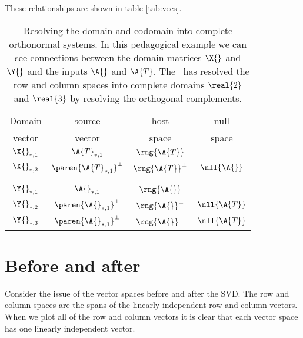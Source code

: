 These relationships are shown in table \eqref{tab:vecs}.

\begin{table}[h]
\begin{center}
\begin{tabular}{cccc}
Domain & source & host & null \\ vector & vector & space & space \\\hline\hline
$\X{}_{*,1}$ & $\A{T}_{*,1}$ & $\rng{\A{T}}$ \\[3pt]
$\X{}_{*,2}$ & $\paren{\A{T}_{*,1}}^{\perp}$ & $\rng{\A{T}}^{\perp}$ & $\nll{\A{}}$\\
&\\\hline
&\\
$\Y{}_{*,1}$ & $\A{}_{*,1}$ & $\rng{\A{}}$ \\[3pt]
$\Y{}_{*,2}$ & $\paren{\A{}_{*,1}}^{\perp}$ & $\rng{\A{}}^{\perp}$ & $\nll{\A{T}}$ \\[3pt]
$\Y{}_{*,3}$ & $\paren{\A{}_{*,1}}^{\perp}$ & $\rng{\A{}}^{\perp}$ & $\nll{\A{T}}$ \\[5pt]
\end{tabular}
\end{center}
\caption[Resolving the domain and codomain into complete orthonormal systems]{Resolving the domain and codomain into complete orthonormal systems. In this pedagogical example we can see connections between the domain matrices $\X{}$ and $\Y{}$ and the inputs $\A{}$ and $\A{T}$. The \svdl \ has resolved the row and column spaces into complete domains $\real{2}$ and $\real{3}$ by resolving the orthogonal complements.}
\label{tab:vecs}
\end{table}

\section{Before and after}
Consider the issue of the vector spaces before and after the SVD. The row and column spaces are the spans of the linearly independent row and column vectors. When we plot all of the row and column vectors it is clear that each vector space has one linearly independent vector.

